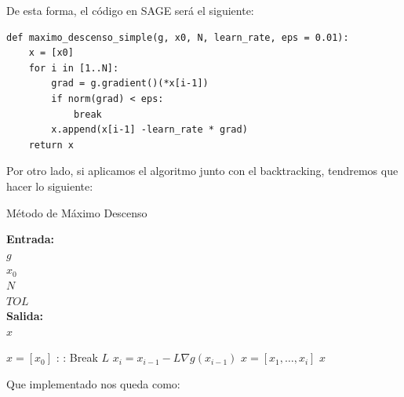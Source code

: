 De esta forma, el código en SAGE será el siguiente:\\

\begin{verbatim}
def maximo_descenso_simple(g, x0, N, learn_rate, eps = 0.01):
	x = [x0]
	for i in [1..N]:
	    grad = g.gradient()(*x[i-1])
	    if norm(grad) < eps:
	    	break
		x.append(x[i-1] -learn_rate * grad)
	return x
\end{verbatim}


Por otro lado, si aplicamos el algoritmo junto con el backtracking, tendremos que hacer lo siguiente:\\

\begin{algorithm}[H]
	\caption{Método de Máximo Descenso}
	\hspace*{\algorithmicindent}\textbf{Entrada: } \\
	\hspace*{\algorithmicindent*2} $g$  \\
	\hspace*{\algorithmicindent*2} $x_0$  \\
	\hspace*{\algorithmicindent*2} $N$  \\
	\hspace*{\algorithmicindent} $TOL$  \\
	\hspace*{\algorithmicindent}\textbf{Salida:} \\
	\hspace*{\algorithmicindent*2} $x$ 
	\begin{algorithmic}
		\Procedure {}{}
		\State $x = [x_0]$ 
		:
		:
			\State Break 
		\EndIf
		\State $L$ 
		\State $x_i = x_{i-1} - L \nabla g(x_{i-1})$
		\State $x = [x_1, \dots , x_i]$
		\EndFor
		\State \Return $x$ 
		\EndProcedure
	\end{algorithmic}
\end{algorithm}

Que implementado nos queda como:\\

